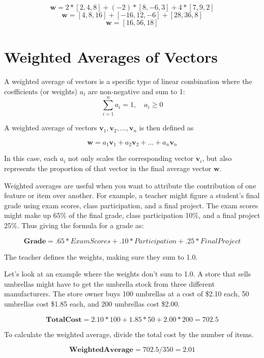 \begin{Answer}[ref=linearCombo]
     \[
	\mathbf{w} = 2*[2,4,8] + (-2)*[8,-6,3] + 4*[7,9,2] 
	\]
  	\[
	\mathbf{w} = [4,8,16] + [-16,12,-6] + [28,36,8] 
	\]  
 	\[
	\mathbf{w} = [16, 56, 18]  
	\]   
\end{Answer}

\section{Weighted Averages of Vectors}
A weighted average of vectors is a specific type of linear combination
where the coefficients (or weights) $a_i$ are non-negative and sum to
1:
\[
\sum_{i=1}^{n} a_i = 1, \quad a_i \geq 0
\]

A weighted average of vectors $\mathbf{v}_1, \mathbf{v}_2, ...,
\mathbf{v}_n$ is then defined as

\[
\mathbf{w} = a_1\mathbf{v}_1 + a_2\mathbf{v}_2 + ... + a_n\mathbf{v}_n
\]

In this case, each $a_i$ not only scales the corresponding vector
$\mathbf{v}_i$, but also represents the proportion of that vector in
the final average vector $\mathbf{w}$.

Weighted averages are useful when you want to attribute the contribution of one feature or item over another. For example, a teacher might figure a student's final grade using exam scores, class participation, and a final project. The exam scores might make up 65\% of the final grade, class participation 10\%, and a final project 25\%. Thus giving the formula for a grade as:

\[
\mathbf{Grade} = .65*ExamScores + .10*Participation + .25*FinalProject
\]

The teacher defines the weights, making sure they sum to 1.0. 

Let's look at an example where the weights don't sum to 1.0. A store that sells umbrellas might have to get the umbrella stock from three different manufacturers. The store owner buys 100 umbrellas at a cost of \$2.10 each, 50 umbrellas cost \$1.85 each, and 200 umbrellas cost \$2.00. 

\[
\mathbf{TotalCost} = 2.10*100 + 1.85*50 + 2.00*200 = 702.5
\]

To calculate the weighted average, divide the total cost by the number of items.

\[
\mathbf{WeightedAverage} = 702.5/350 = 2.01 
\]

